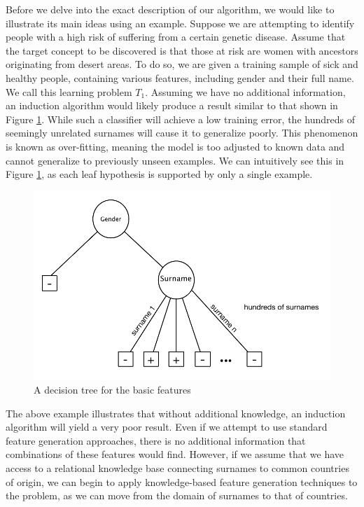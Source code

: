 \documentclass[twoside,11pt]{article}
\theoremstyle{definition}
\begin{document}
Before we delve into the exact description of our algorithm, we would like to illustrate its main ideas using an example.
Suppose we are attempting to identify people with a high risk of suffering from a certain genetic disease. Assume that the target concept to be discovered is that those at risk are women with ancestors originating from desert areas. To do so, we are given a training sample of sick and healthy people, containing various features, including gender and their full name. We call this learning problem $T_1$.
Assuming we have no additional information, an induction algorithm would likely produce a result similar to that shown in Figure \ref{fig:tree_base}. While such a classifier will achieve a low training error, the hundreds of seemingly unrelated surnames will cause it to generalize poorly. This phenomenon is known as over-fitting, meaning the model is too adjusted to known data and cannot generalize to previously unseen examples. We can intuitively see this in Figure \ref{fig:tree_base}, as each leaf hypothesis is supported by only a single example.

\begin{figure}
	\centering
	\includegraphics[width=\linewidth]{fig1.pdf}
	\caption{A decision tree for the basic features}
	\label{fig:tree_base}
\end{figure}

The above example illustrates that without additional knowledge, an induction algorithm will yield a very poor result. Even if we attempt to use standard feature generation approaches, there is no additional information that combinations of these features would find.
However, if we assume that we have access to a relational knowledge base connecting surnames to common countries of origin, we can begin to apply knowledge-based feature generation techniques to the problem, as we can move from the domain of surnames to that of countries. 
\end{document}
